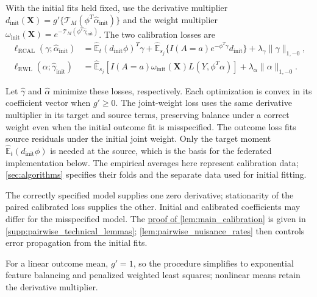 \documentclass[12pt]{article}
\providecommand{\En}{\widehat{\mathbb E}}
\begin{document}
With the initial fits held fixed, use the derivative multiplier $d_{\mathrm{init}}(\boldsymbol X)=g'\{\mathcal T_M(\phi^T\widehat\alpha_{\mathrm{init}})\}$ and the weight multiplier $\omega_{\mathrm{init}}(\boldsymbol X)=e^{-\mathcal T_M(\phi^T\widehat\gamma_{\mathrm{init}})}$. The two calibration losses are
\begin{align}
\ell_{\mathrm{RCAL}}(\gamma;\widehat\alpha_{\mathrm{init}})
&=\En_t(d_{\mathrm{init}}\phi)^T\gamma
+\En_{s_j}\{I(A=a)e^{-\phi^T\gamma}d_{\mathrm{init}}\}
+\lambda_\gamma\|\gamma\|_{1,-0},\label{eq:gamma_calibrated_loss}\\
\ell_{\mathrm{RWL}}(\alpha;\widehat\gamma_{\mathrm{init}})
&=\En_{s_j}\left[I(A=a)\omega_{\mathrm{init}}(\boldsymbol X)
L(Y,\phi^T\alpha)\right]
+\lambda_\alpha\|\alpha\|_{1,-0}.\label{eq:alpha_calibrated_loss}
\end{align}

Let $\widehat\gamma$ and $\widehat\alpha$ minimize these losses, respectively. Each optimization is convex in its coefficient vector when $g'\ge0$. The joint-weight loss uses the same derivative multiplier in its target and source terms, preserving balance under a correct weight even when the initial outcome fit is misspecified. The outcome loss fits source residuals under the initial joint weight. Only the target moment $\En_t(d_{\mathrm{init}}\phi)$ is needed at the source, which is the basis for the federated implementation below. The empirical averages here represent calibration data; \cref{sec:algorithms} specifies their folds and the separate data used for initial fitting.

\begin{lemma}\label{lem:main_calibration}
\FACEHDSourceCalibration
\end{lemma}

The correctly specified model supplies one zero derivative; stationarity of the paired calibrated loss supplies the other. Initial and calibrated coefficients may differ for the misspecified model. The \hyperref[proof:main_calibration]{proof of \cref*{lem:main_calibration}} is given in \cref{supp:pairwise_technical_lemmas}; \cref{lem:pairwise_nuisance_rates} then controls error propagation from the initial fits.

For a linear outcome mean, $g'=1$, so the procedure simplifies to exponential feature balancing and penalized weighted least squares; nonlinear means retain the derivative multiplier.
\end{document}
